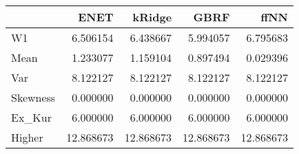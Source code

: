 \begin{tabular}{lrrrr}
\toprule
{} &       ENET &     kRidge &       GBRF &       ffNN \\
\midrule
W1       &   6.506154 &   6.438667 &   5.994057 &   6.795683 \\
Mean     &   1.233077 &   1.159104 &   0.897494 &   0.029396 \\
Var      &   8.122127 &   8.122127 &   8.122127 &   8.122127 \\
Skewness &   0.000000 &   0.000000 &   0.000000 &   0.000000 \\
Ex\_Kur   &   6.000000 &   6.000000 &   6.000000 &   6.000000 \\
Higher   &  12.868673 &  12.868673 &  12.868673 &  12.868673 \\
\bottomrule
\end{tabular}
